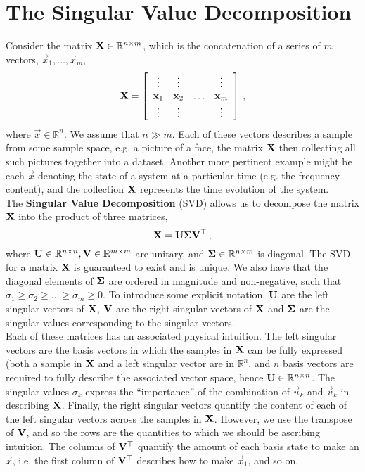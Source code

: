\section{The Singular Value Decomposition}

Consider the matrix $\mathbf{X}\in\mathbb{R}^{n\times m}$, which is the
concatenation of a series of $m$ vectors, $\vec{x}_1,\hdots,\vec{x}_m$,
%
\begin{displaymath}
  \mathbf{X} = \left[\begin{array}{cccc}
      \vdots & \vdots & & \vdots \\
      \mathbf{x}_1 & \mathbf{x}_2 & \hdots & \mathbf{x}_m \\
      \vdots & \vdots & & \vdots
    \end{array}\right] \,,
\end{displaymath}
%
where $\vec{x}\in\mathbb{R}^n$. We assume that $n\gg m$. Each of these vectors
describes a sample from some sample space, e.g. a picture of a face, the
matrix $\mathbf{X}$ then collecting all such pictures together into a dataset.
Another more pertinent example might be each $\vec{x}$ denoting the state of
a system at a particular time (e.g. the frequency content), and the
collection $\mathbf{X}$ represents the time evolution of the system.\\

The \textbf{Singular Value Decomposition} (SVD) allows us to decompose the
matrix $\mathbf{X}$ into the product of three matrices,
%
\begin{equation}
  \mathbf{X} = \mathbf{U}\mathbf{\Sigma}\mathbf{V}^\top \,,
\end{equation}
%
where $\mathbf{U}\in\mathbb{R}^{n\times n}, \mathbf{V}\in\mathbb{R}^{m\times m}$
are unitary, and $\mathbf{\Sigma}\in\mathbb{R}^{n\times m}$ is diagonal.
The SVD for a matrix $\mathbf{X}$ is guaranteed to exist and is unique.
We also have that the diagonal elements of $\mathbf{\Sigma}$ are ordered in
magnitude and non-negative, such that
$\sigma_1 \geq \sigma_2 \geq \hdots \geq \sigma_m \geq 0$. To introduce some
explicit notation, $\mathbf{U}$ are the left singular vectors of $\mathbf{X}$,
$\mathbf{V}$ are the right singular vectors of $\mathbf{X}$ and $\mathbf{\Sigma}$
are the singular values corresponding to the singular vectors.\\

Each of these matrices has an associated physical intuition. The left singular
vectors are the basis vectors in which the samples in $\mathbf{X}$ can be fully
expressed (both a sample in $\mathbf{X}$ and a left singular vector are in
$\mathbb{R}^n$, and $n$ basis vectors are required to fully describe the
associated vector space, hence $\mathbf{U}\in\mathbb{R}^{n\times n}$. The singular
values $\sigma_k$ express the ``importance'' of the combination of $\vec{u}_k$
and $\vec{v}_k$ in describing $\mathbf{X}$. Finally, the right singular vectors
quantify the content of each of the left singular vectors across the samples in
$\mathbf{X}$. However, we use the transpose of $\mathbf{V}$, and so the rows are
the quantities to which we should be ascribing intuition. The columns of
$\mathbf{V}^\top$ quantify the amount of each basis state to make an $\vec{x}$,
i.e. the first column of $\mathbf{V}^\top$ describes how to make $\vec{x}_1$, and
so on.\\

